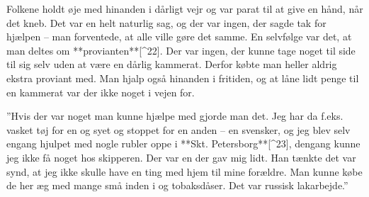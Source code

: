 \documentclass{book}
\begin{document}


Folkene holdt øje med hinanden i dårligt vejr og var parat til at give en hånd, når det
kneb. Det var en helt naturlig sag, og der var ingen, der sagde tak for hjælpen – man
forventede, at alle ville gøre det samme. En selvfølge var det, at man deltes om
**provianten**[^22]. Der var ingen, der kunne tage noget til side til sig selv uden at være en
dårlig kammerat. Derfor købte man heller aldrig ekstra proviant med. Man hjalp også
hinanden i fritiden, og at låne lidt penge til en kammerat var der ikke noget i vejen for.

 ”Hvis der var noget man kunne hjælpe med gjorde man det. Jeg har da f.eks. vasket tøj for
en og syet og stoppet for en anden – en svensker, og jeg blev selv engang hjulpet med
nogle rubler oppe i **Skt. Petersborg**[^23], dengang kunne jeg ikke få noget hos skipperen. Der
var en der gav mig lidt. Han tænkte det var synd, at jeg ikke skulle have en ting med hjem
til mine forældre. Man kunne købe de her æg med mange små inden i og tobaksdåser. Det var
russisk lakarbejde.”
\end{document}
